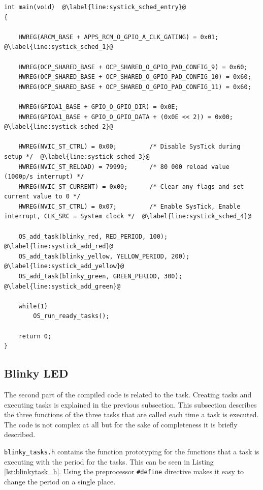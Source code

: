 \begin{lstlisting}[style=CStyle, caption={Entry point for the scheduler foreground process}, captionpos=b, label={lst:scheduler_systick_main}, escapechar=@]
int main(void)  @\label{line:systick_sched_entry}@
{

    HWREG(ARCM_BASE + APPS_RCM_O_GPIO_A_CLK_GATING) = 0x01;         @\label{line:systick_sched_1}@

    HWREG(OCP_SHARED_BASE + OCP_SHARED_O_GPIO_PAD_CONFIG_9) = 0x60;
    HWREG(OCP_SHARED_BASE + OCP_SHARED_O_GPIO_PAD_CONFIG_10) = 0x60;
    HWREG(OCP_SHARED_BASE + OCP_SHARED_O_GPIO_PAD_CONFIG_11) = 0x60;

    HWREG(GPIOA1_BASE + GPIO_O_GPIO_DIR) = 0x0E;
    HWREG(GPIOA1_BASE + GPIO_O_GPIO_DATA + (0x0E << 2)) = 0x00;     @\label{line:systick_sched_2}@

    HWREG(NVIC_ST_CTRL) = 0x00;         /* Disable SysTick during setup */  @\label{line:systick_sched_3}@
    HWREG(NVIC_ST_RELOAD) = 79999;      /* 80 000 reload value (1000p/s interrupt) */
    HWREG(NVIC_ST_CURRENT) = 0x00;      /* Clear any flags and set current value to 0 */
    HWREG(NVIC_ST_CTRL) = 0x07;         /* Enable SysTick, Enable interrupt, CLK_SRC = System clock */  @\label{line:systick_sched_4}@

    OS_add_task(blinky_red, RED_PERIOD, 100);           @\label{line:systick_add_red}@
    OS_add_task(blinky_yellow, YELLOW_PERIOD, 200);     @\label{line:systick_add_yellow}@
    OS_add_task(blinky_green, GREEN_PERIOD, 300);       @\label{line:systick_add_green}@

    while(1)
        OS_run_ready_tasks();

    return 0;
}
\end{lstlisting}

\subsection{Blinky LED}
\label{subsec:blinky_led}

The second part of the compiled code is related to the task.
Creating tasks and executing tasks is explained in the previous subsection.
This subsection describes the three functions of the three tasks that are called each time a task is executed.
The code is not complex at all but for the sake of completeness it is briefly described.

\texttt{blinky\_tasks.h} contains the function prototyping for the functions that a task is executing with the period for the tasks. This can be seen in Listing \ref{lst:blinkytask_h}. Using the preprocessor \texttt{\#define} directive makes it easy to change the period on a single place.

